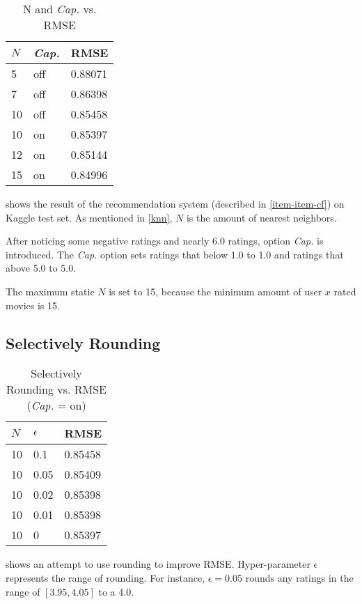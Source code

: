 \documentclass{ece}
\begin{document}
\begin{table}[!htpb]
    \caption[N and \textit{Cap.} vs. RMSE]{N and \textit{Cap.} vs. RMSE}
    \label{tab:table-2}
    \centering
\begin{tabular}{|l|l|l|}
\hline
$N$  & \textit{Cap.} & RMSE    \\ \hline
5  & off  & 0.88071 \\ \hline
7  & off  & 0.86398 \\ \hline
10 & off  & 0.85458 \\ \hline
10 & on   & 0.85397 \\ \hline
12 & on   & 0.85144 \\ \hline
15 & on   & 0.84996 \\ \hline
\end{tabular}
\end{table}

 shows the result of the recommendation system (described in \ref{item-item-cf}) on Kaggle test set.
As mentioned in \ref{knn}, $N$ is the amount of nearest neighbors.

After noticing some negative ratings and nearly 6.0 ratings, option \textit{Cap.} is introduced.
The \textit{Cap.} option sets ratings that below 1.0 to 1.0 and ratings that above 5.0 to 5.0.

The maximum static $N$ is set to 15, because the minimum amount of user $x$ rated movies is 15.

\subsection{Selectively Rounding}

\begin{table}[h]
    \caption[Selectively Rounding vs. RMSE]{Selectively Rounding vs. RMSE (\textit{Cap.} = on)}
    \label{tab:table-3}
    \centering
\begin{tabular}{|l|l|l|}
\hline
$N$  & $\epsilon$ & RMSE    \\ \hline
10 & 0.1     & 0.85458 \\ \hline
10 & 0.05    & 0.85409 \\ \hline
10 & 0.02    & 0.85398 \\ \hline
10 & 0.01    & 0.85398 \\ \hline
10 & 0       & 0.85397 \\ \hline
\end{tabular}
\end{table}

 shows an attempt to use rounding to improve RMSE. 
Hyper-parameter $\epsilon$ represents the range of rounding. For instance, $\epsilon=0.05$ rounds any ratings in the range of $[3.95, 4.05]$ to a 4.0.
\end{document}
